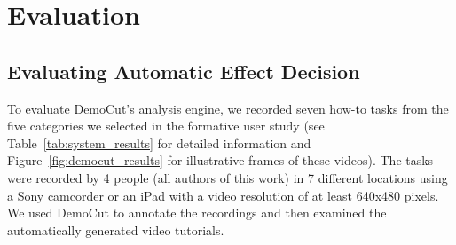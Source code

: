 \section{Evaluation}

\subsection{Evaluating Automatic Effect Decision}

To evaluate DemoCut's analysis engine, we recorded seven how-to tasks
from the five categories we selected in the formative user study
(see Table~\ref{tab:system_results} for detailed information and Figure~\ref{fig:democut_results} for illustrative frames of these videos).
%
The tasks were recorded by 4 people (all authors of this
work) in 7 different locations using a Sony camcorder or an iPad with
a video resolution of at least 640x480 pixels.
%
We used DemoCut to annotate the recordings and then examined the
automatically generated video tutorials.

